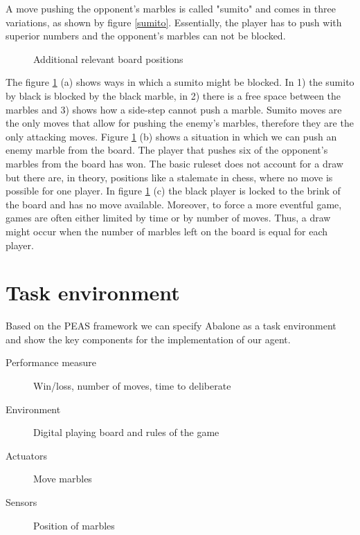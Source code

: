 A move pushing the opponent's marbles is called "sumito" and comes in three variations, as shown by figure \ref{sumito}. Essentially, the player has to push with superior numbers and the opponent's marbles can not be blocked.

\begin{figure}[!h]
    \centering
    \hfill
    \hfill
    \caption{Additional relevant board positions \cite{abalone_sa_abalone_nodate}}
    \label{additional_relevant_positions}
\end{figure}

The figure \ref{additional_relevant_positions} (a) shows ways in which a sumito might be blocked. In 1) the sumito by black is blocked by the black marble, in 2) there is a free space between the marbles and 3) shows how a side-step cannot push a marble. Sumito moves are the only moves that allow for pushing the enemy's marbles, therefore they are the only attacking moves. Figure \ref{additional_relevant_positions} (b) shows a situation in which we can push an enemy marble from the board. The player that pushes six of the opponent's marbles from the board has won. The basic ruleset does not account for a draw but there are, in theory, positions like a stalemate in chess, where no move is possible for one player. In figure \ref{additional_relevant_positions} (c) the black player is locked to the brink of the board and has no move available. Moreover, to force a more eventful game, games are often either limited by time or by number of moves. Thus, a draw might occur when the number of marbles left on the board is equal for each player.

\section{Task environment}
Based on the PEAS framework we can specify Abalone as a task environment and show the key components for the implementation of our agent. \cite[p.107]{russell_artificial_2021}

\begin{description}
    \item[Performance measure] Win/loss, number of moves, time to deliberate
    \item[Environment] Digital playing board and rules of the game
    \item[Actuators] Move marbles
    \item[Sensors] Position of marbles
\end{description}

